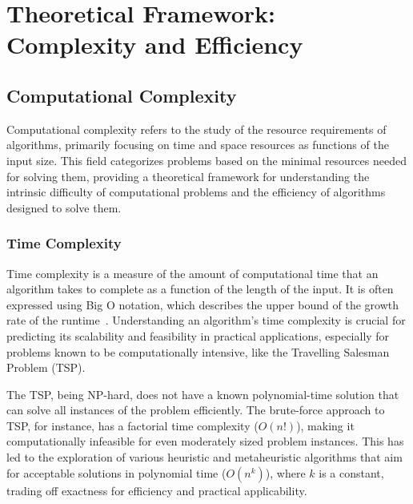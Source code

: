 \chapter{Theoretical Framework: Complexity and Efficiency}\label{chapt:2}

\section{Computational Complexity}

Computational complexity refers to the study of the resource requirements of algorithms, primarily focusing on time and space resources as functions of the input size. This field categorizes problems based on the minimal resources needed for solving them, providing a theoretical framework for understanding the intrinsic difficulty of computational problems and the efficiency of algorithms designed to solve them. ~\cite{GareyJohnson1979}

\subsection{Time Complexity}

Time complexity is a measure of the amount of computational time that an algorithm takes to complete as a function of the length of the input. It is often expressed using Big O notation, which describes the upper bound of the growth rate of the runtime~\cite{BigONotation}. Understanding an algorithm's time complexity is crucial for predicting its scalability and feasibility in practical applications, especially for problems known to be computationally intensive, like the Travelling Salesman Problem (TSP).

The TSP, being NP-hard, does not have a known polynomial-time solution that can solve all instances of the problem efficiently. The brute-force approach to TSP, for instance, has a factorial time complexity (\(O(n!)\)), making it computationally infeasible for even moderately sized problem instances. This has led to the exploration of various heuristic and metaheuristic algorithms that aim for acceptable solutions in polynomial time (\(O(n^k)\)), where \(k\) is a constant, trading off exactness for efficiency and practical applicability.~\cite{Dorigo1996}

